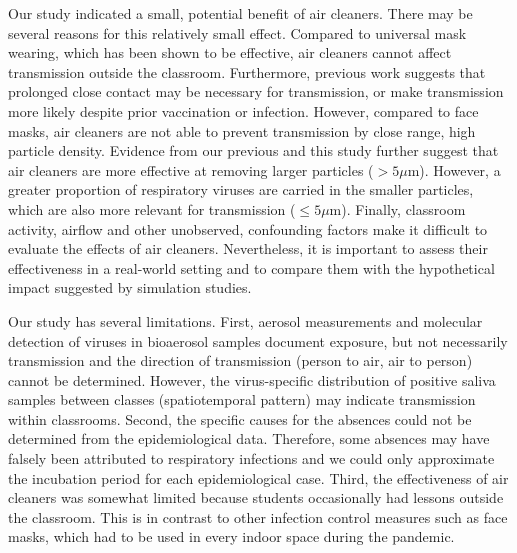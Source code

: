 \documentclass[fleqn,11pt]{wlscirep}
\begin{document}

Our study indicated a small, potential benefit of air cleaners. There may be several reasons for this relatively small effect. Compared to \eg universal mask wearing, which has been shown to be effective\cite{Banholzer2023PLoSMed,Heinsohn2022,Gettings2021,Dharmadhikari2012AJRCCM,Leung2020NatMed,Milton2013PLoSPathogens}, air cleaners cannot affect transmission outside the classroom. Furthermore, previous work suggests that prolonged close contact may be necessary for transmission\cite{Leung2020NatMed,Brankston2007LancetID}, or make transmission more likely despite prior vaccination or infection\cite{Lind2023NatCommun}. However, compared to face masks, air cleaners are not able to prevent transmission by close range, high particle density. Evidence from our previous\cite{Banholzer2023PLoSMed} and this study further suggest that air cleaners are more effective at removing larger particles ($>5\mu$m). However, a greater proportion of respiratory viruses are carried in the smaller particles, which are also more relevant for transmission ($\leq5\mu$m)\cite{Fennelly2020}. Finally, classroom activity, airflow and other unobserved, confounding factors make it difficult to evaluate the effects of air cleaners. Nevertheless, it is important to assess their effectiveness in a real-world setting and to compare them with the hypothetical impact suggested by simulation studies\cite{Lindsley2021,Cortellessa2023Build}.



Our study has several limitations. First, aerosol measurements and molecular detection of viruses in bioaerosol samples document exposure, but not necessarily transmission and the direction of transmission (person to air, air to person) cannot be determined. However, the virus-specific distribution of positive saliva samples between classes (spatiotemporal pattern) may indicate transmission within classrooms. Second, the specific causes for the absences could not be determined from the epidemiological data. Therefore, some absences may have falsely been attributed to respiratory infections and we could only approximate the incubation period for each epidemiological case. Third, the effectiveness of air cleaners was somewhat limited because students occasionally had lessons outside the classroom. This is in contrast to other infection control measures such as face masks, which had to be used in every indoor space during the pandemic.

\end{document}
